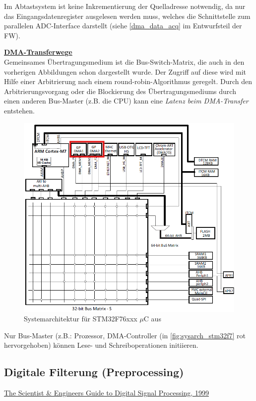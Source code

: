 \documentclass[a4paper, portrait, 12pt]{scrartcl} %
\begin{document}
Im Abtastsystem ist keine Inkrementierung der Quelladresse notwendig, da nur das Eingangsdatenregister ausgelesen werden muss, welches die Schnittstelle zum parallelen ADC-Interface darstellt (siehe \autoref{dma_data_acq} im Entwurfsteil der FW).

\pagebreak

\textbf{\underline{DMA-Transferwege}}\\

Gemeinsames Übertragungsmedium ist die Bus-Switch-Matrix, die auch in den vorherigen Abbildungen schon dargestellt wurde. Der Zugriff auf diese wird mit Hilfe einer Arbitrierung nach einem round-robin-Algorithmus geregelt. 
Durch den Arbitrierungsvorgang oder die Blockierung des Übertragungsmediums durch einen anderen Bus-Master (z.B. die CPU) kann eine \emph{Latenz beim DMA-Transfer} entstehen.

\begin{figure}[H]
	\centering
    \includegraphics[scale=0.7]{Systemarchitektur_STM32F7.png} 
	\caption{Systemarchitektur für STM32F76xxx $\mu$C aus \cite[S. 72]{STmicroelectronics2024}}
	\label{fig:sysarch_stm32f7}
\end{figure}

Nur Bus-Master (z.B.: Prozessor, DMA-Controller (in \autoref{fig:sysarch_stm32f7} rot hervorgehoben) können Lese- und Schreiboperationen initiieren.

\pagebreak

\subsection{Digitale Filterung (Preprocessing)}
\href{https://www.analog.com/en/resources/technical-books/scientist_engineers_guide.html}{The Scientist \& Engineers Guide to Digital Signal Processing, 1999}
\end{document}
